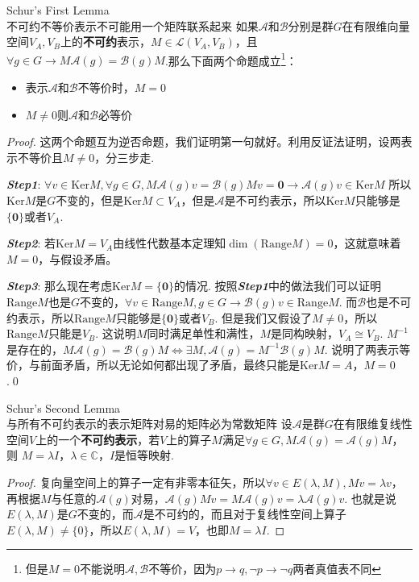 \begin{theorem}{Schur's First Lemma\\不可约不等价表示不可能用一个矩阵联系起来}
    如果$\mathscr{A}$和$\mathscr{B}$分别是群$G$在有限维向量空间$V_A,V_B$上的\textbf{不可约}表示，$M\in \mathcal{L}(V_A,V_B)$，且$\forall g\in G\rightarrow M\mathscr{A}(g)=\mathscr{B}(g)M$.那么下面两个命题成立\footnote{但是$M=0$不能说明$\mathscr{A},\mathscr{B}$不等价，因为$p\rightarrow q ,\neg p\rightarrow\neg q$两者真值表不同}：
    \begin{itemize}
        \item 表示$\mathscr{A}$和$\mathscr{B}$不等价时，$M=0$
        \item $M \neq 0$则$\mathscr{A}$和$\mathscr{B}$必等价
    \end{itemize}
\end{theorem}
\begin{proof}
    这两个命题互为逆否命题，我们证明第一句就好。利用反证法证明，设两表示不等价且$M\neq 0$，分三步走.
    
    {\itshape \textbf{Step1}}: $\forall v\in\mathrm{Ker}M,\forall g\in G, M\mathscr{A}(g)v=\mathscr{B}(g)Mv=\mathbf{0}\rightarrow\mathscr{A}(g)v\in\mathrm{Ker}M$
    所以$\mathrm{Ker}M$是$G$不变的，但是$\mathrm{Ker}M\subset V_A$，但是$\mathscr{A}$是不可约表示，所以$\mathrm{Ker}M$只能够是$\{\mathbf{0}\}$或者$V_A$.

    {\itshape \textbf{Step2}}: 若$\mathrm{Ker}M=V_A$由线性代数基本定理知$\dim(\mathrm{Range}M)=0$，这就意味着$M=0$，与假设矛盾。
    
    {\itshape \textbf{Step3}}: 那么现在考虑$\mathrm{Ker}M=\{\mathbf{0}\}$的情况.
    按照{\itshape \textbf{Step1}}中的做法我们可以证明$\mathrm{Range}M$也是$G$不变的，$\forall v\in \mathrm{Range}M,g\in G\rightarrow \mathscr{B}(g)v\in\mathrm{Range}M$.
    而$\mathscr{B}$也是不可约表示，所以$\mathrm{Range}M$只能够是$\{\mathbf{0}\}$或者$V_B$. 但是我们又假设了$M\neq 0$，所以$\mathrm{Range}M$只能是$V_B$.
    这说明$M$同时满足单性和满性，$M$是同构映射，$V_A\cong V_B$. $M^{-1}$是存在的，$M\mathscr{A}(g)=\mathscr{B}(g)M\iff \exists M,\mathscr{A}(g)=M^{-1}\mathscr{B}(g)M$.
    说明了两表示等价，与前面矛盾，所以无论如何都出现了矛盾，最终只能是$\mathrm{Ker}M=A$，$M=0$.\qed
\end{proof}
\begin{theorem}{Schur's Second Lemma\\与所有不可约表示的表示矩阵对易的矩阵必为常数矩阵}
    设$\mathscr{A}$是群$G$在有限维复线性空间$V$上的一个\textbf{不可约表示}，若$V$上的算子$M$满足$\forall g\in G,M\mathscr{A}(g)=\mathscr{A}(g)M$，则
    $M=\lambda I$，$\lambda\in\mathbb{C}$，$I$是恒等映射.
\end{theorem}
\begin{proof}
    复向量空间上的算子一定有非零本征矢，所以$\forall v\in E(\lambda,M),Mv=\lambda v$，再根据$M$与任意的$\mathscr{A}(g)$对易，$\mathscr{A}(g)Mv=M\mathscr{A}(g)v=\lambda\mathscr{A}(g)v$.
    也就是说$E(\lambda,M)$是$G$不变的，而$\mathscr{A}$是不可约的，而且对于复线性空间上算子$E(\lambda,M)\neq \{0\}$，所以$E(\lambda,M)=V$，也即$M=\lambda I$.
\end{proof}


